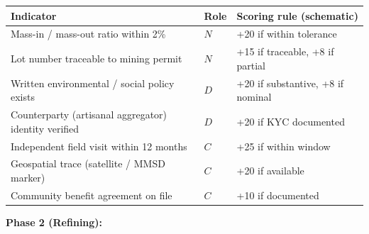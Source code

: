 \documentclass[12pt]{article}
\begin{document}
\begin{longtable}[]{@{}
  >{\raggedright\arraybackslash}p{}
  >{\raggedright\arraybackslash}p{}
  >{\raggedright\arraybackslash}p{}@{}}
\toprule\noalign{}
\begin{minipage}[b]{\linewidth}\raggedright
Indicator
\end{minipage} & \begin{minipage}[b]{\linewidth}\raggedright
Role
\end{minipage} & \begin{minipage}[b]{\linewidth}\raggedright
Scoring rule (schematic)
\end{minipage} \\
\midrule\noalign{}
\endhead
\bottomrule\noalign{}
\endlastfoot
Mass-in / mass-out ratio within 2\% & \(N\) & +20 if within tolerance \\
Lot number traceable to mining permit & \(N\) & +15 if traceable, +8 if
partial \\
Written environmental / social policy exists & \(D\) & +20 if
substantive, +8 if nominal \\
Counterparty (artisanal aggregator) identity verified & \(D\) & +20 if
KYC documented \\
Independent field visit within 12 months & \(C\) & +25 if within
window \\
Geospatial trace (satellite / MMSD marker) & \(C\) & +20 if available \\
Community benefit agreement on file & \(C\) & +10 if documented \\
\end{longtable}

\textbf{Phase 2 (Refining):}
\end{document}
